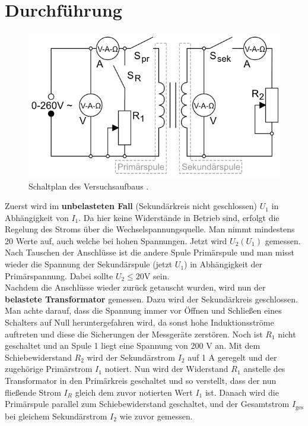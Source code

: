 \documentclass[12pt,a4paper,titlepage,headinclude,bibtotoc]{scrartcl}
\begin{document}
\section{Durchführung}
\label{sec:durchfuehrung}
\begin{figure}[!htb]
	\centering	
	\includegraphics[scale=1.0]{TrafoSchaltung.png}
	\caption{Schaltplan des Versuchsaufbaus \cite[Datum: 01.09.2014]{LP16}.}
	\label{fig:Schaltung}
\end{figure}
Zuerst wird im \textbf{unbelasteten Fall} (Sekundärkreis nicht geschlossen) $U_1$ in Abhängigkeit von $I_1$.
Da hier keine Widerstände in Betrieb sind, erfolgt die Regelung des Stroms über die Wechselspannungsquelle.
Man nimmt mindestens 20 Werte auf, auch welche bei hohen Spannungen.
Jetzt wird $U_2(U_1)$ gemessen.
Nach Tauschen der Anschlüsse ist die andere Spule Primärspule und man misst wieder die Spannung der Sekundärspule (jetzt $U_1$) in Abhängigkeit der Primärspannung.
Dabei sollte $U_2\leq 20$V sein.\\
Nachdem die Anschlüsse wieder zurück getauscht wurden, wird nun der \textbf{belastete Transformator} gemessen.
Dazu wird der Sekundärkreis geschlossen.
Man achte darauf, dass die Spannung immer vor Öffnen und Schließen eines Schalters auf Null heruntergefahren wird, da sonst hohe Induktionsströme auftreten und diese die Sicherungen der Messgeräte zerstören.
Noch ist $R_1$ nicht geschaltet und an Spule 1 liegt eine Spannung von 200 V an.
Mit dem Schiebewiderstand $R_2$ wird der Sekundärstrom $I_2$ auf 1 A geregelt und der zugehörige Primärstrom $I_1$ notiert.
Nun wird der Widerstand $R_1$ anstelle des Transformator in den Primärkreis geschaltet und so verstellt, dass der nun fließende Strom $I_R$ gleich dem zuvor notierten Wert $I_1$ ist.
Danach wird die Primärspule parallel zum Schiebewiderstand geschaltet, und der Gesamtstrom $I_\text{ges}$ bei gleichem Sekundärstrom $I_2$ wie zuvor gemessen.
\end{document}
